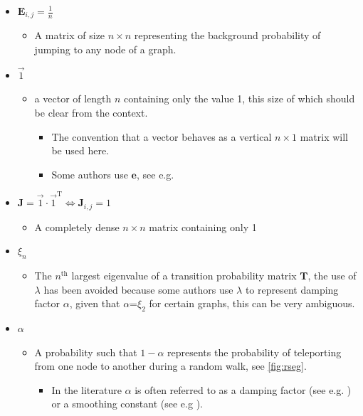\documentclass[11pt, twoside]{report}
\begin{document}
\begin{itemize}
\begin{itemize}
\begin{itemize}
\end{itemize}
\end{itemize}
\item \(\mathbf{E}_{i,j} = \frac{1}{n}\)
\begin{itemize}
\item A matrix of size \(n\times n\) representing the background probability of jumping to any node of a graph.
\end{itemize}
\item \(\vec{1}\)
\begin{itemize}
\item a vector of length \(n\) containing only the value 1, this size of which should be clear from the context.
\begin{itemize}
\item The convention that a vector behaves as a vertical \(n \times 1\) matrix will be used here.
\item Some authors use \(\mathbf{e}\), see e.g. \cite{langvilleGooglePageRankScience2012}
\end{itemize}
\end{itemize}
\item \(\mathbf{J} = \vec{1}\cdot \vec{1}^{\mathrm{T}} \iff \mathbf{J}_{i,j} = 1\)
\begin{itemize}
\item A completely dense \(n \times n\) matrix containing only 1
\end{itemize}
\item \(\xi_{n}\)
\begin{itemize}
\item The \(n^{\mathrm{th}}\) largest eigenvalue of a transition probability matrix \(\mathbf{T}\), the use of \(\lambda\) has been avoided because some authors use \(\lambda\) to represent damping factor \(\alpha\), given that \(\alpha\)=\(\xi_{2}\) for certain graphs, this can be very ambiguous.
\end{itemize}
\item \(\alpha\)
\begin{itemize}
\item A probability such that \(1-\alpha\) represents the probability of teleporting from one node to another during a random walk, see \ref{fig:rseg}.
\begin{itemize}
\item In the literature \(\alpha\) is often referred to as a damping factor (see e.g.  \cite{berkhoutRankingNodesGeneral2018a,brinkmeierPageRankRevisited2006a,fuDampingFactorGoogle2006,kamvarAdaptiveMethodsComputation2004b,bianchiniPageRank2005}) or a smoothing constant (see e.g \cite{koppelMeasuringDirectIndirect2014}).
\end{itemize}
\end{itemize}
\end{itemize}
\end{document}
